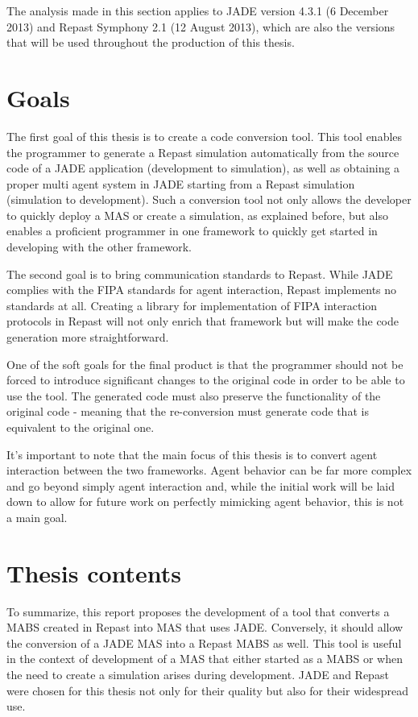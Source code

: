 The analysis made in this section applies to JADE version 4.3.1 (6 December 2013) and Repast Symphony 2.1 (12 August 2013), which are also the versions that will be used throughout the production of this thesis.


\section{Goals}
The first goal of this thesis is to create a code conversion tool. This tool enables the programmer to generate a Repast simulation automatically from the source code of a JADE application (development to simulation), as well as obtaining a proper multi agent system in JADE starting from a Repast simulation (simulation to development). Such a conversion tool not only allows the developer to quickly deploy a MAS or create a simulation, as explained before, but also enables a proficient programmer in one framework to quickly get started in developing with the other framework.

The second goal is to bring communication standards to Repast. While JADE complies with the FIPA standards for agent interaction, Repast implements no standards at all. Creating a library for implementation of FIPA interaction protocols in Repast will not only enrich that framework but will make the code generation more straightforward.

One of the soft goals for the final product is that the programmer should not be forced to introduce significant changes to the original code in order to be able to use the tool. The generated code must also preserve the functionality of the original code - meaning that the re-conversion must generate code that is equivalent to the original one.

It's important to note that the main focus of this thesis is to convert agent interaction between the two frameworks. Agent behavior can be far more complex and go beyond simply agent interaction and, while the initial work will be laid down to allow for future work on perfectly mimicking agent behavior, this is not a main goal.
 

\section{Thesis contents} \label{sec:struct}

To summarize, this report proposes the development of a tool that converts a MABS created in Repast into MAS that uses JADE. Conversely, it should allow the conversion of a JADE MAS into a Repast MABS as well. This tool is useful in the context of development of a MAS that either started as a MABS or when the need to create a simulation arises during development. JADE and Repast were chosen for this thesis not only for their quality but also for their widespread use.

